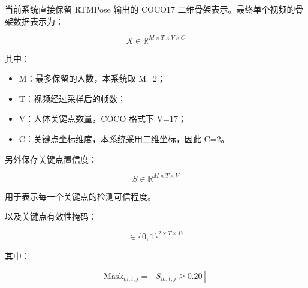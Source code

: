 当前系统直接保留 RTMPose 输出的 COCO17 二维骨架表示。最终单个视频的骨架数据表示为：

\[
X\in\mathbb{R}^{M\times T\times V\times C}
\]

其中：

\begin{itemize}
\item M：最多保留的人数，本系统取 M=2；
\item T：视频经过采样后的帧数；
\item V：人体关键点数量，COCO 格式下 V=17；
\item C：关键点坐标维度，本系统采用二维坐标，因此 C=2。
\end{itemize}

另外保存关键点置信度：

\[
S\in\mathbb{R}^{M\times T\times V}
\]

用于表示每一个关键点的检测可信程度。

以及关键点有效性掩码：

\[
\in\{0,1\}^{2\times T\times17}
\]

其中：

\[
\mathrm{Mask}_{m,t,j}=[S_{m,t,j}\geq 0.20]
\]

